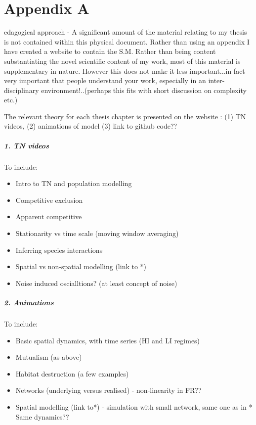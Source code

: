 %
%

\chapter{Appendix A}
\label{app:app01}

edagogical approach - A significant amount of the material relating to my thesis is not contained within this physical document. Rather than using an appendix I have created a website to contain the S.M. Rather than being content substantiating the novel scientific content of my work, most of this material is supplementary in nature. However this does not make it less important...in fact very important that people understand your work, especially in an inter-disciplinary environment!..(perhaps this fits with short discussion on complexity etc.)

The relevant theory for each thesis chapter is presented on the website : (1) TN videos, (2) animations of model (3) link to github code??


\paragraph*{1. TN videos}

To include:

\begin{itemize}
	\item Intro to TN and population modelling
	\item Competitive exclusion
	\item Apparent competitive
	\item Stationarity vs time scale (moving window averaging)
	\item Inferring species interactions
	\item Spatial vs non-spatial modelling (link to *)
	\item Noise induced oscialltions? (at least concept of noise)
\end{itemize}



\paragraph*{2. Animations}

To include:

\begin{itemize}
	\item Basic spatial dynamics, with time series (HI and LI regimes)
	\item Mutualism (as above)
	\item Habitat destruction (a few examples)
	\item Networks (underlying versus realised) - non-linearity in FR??
	\item Spatial modelling (link to*) - simulation with small network, same one as in * Same dynamics??
\end{itemize}


